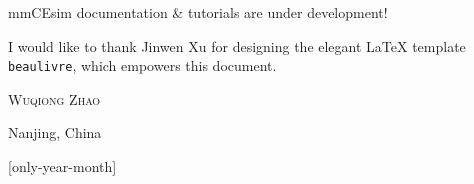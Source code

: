 mmCEsim documentation \& tutorials are under development!

I would like to thank Jinwen Xu for designing
the elegant \LaTeX{} template \texttt{beaulivre},
which empowers this document.

\begin{flushright}
  \textsc{Wuqiong Zhao}

  Nanjing, China

  \TheDate{\the\year/\the\month}[only-year-month]
\end{flushright}
